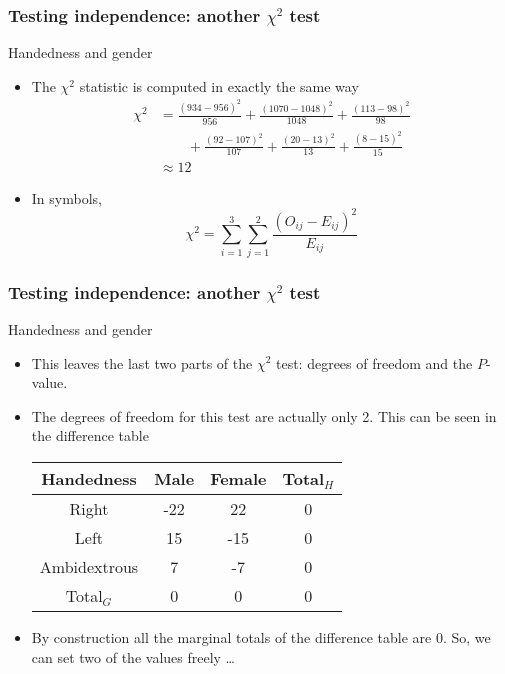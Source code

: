 \documentclass[handout]{beamer}
\begin{document}

   \begin{frame} \frametitle{Testing independence: another $\chi^2$ test}

   \begin{block}
     {Handedness and gender}
     \begin{itemize}
     \item The $\chi^2$ statistic is computed in exactly the same way
       $$
       \begin{aligned}
         \chi^2 &= \frac{(934-956)^2}{956} + \frac{(1070-1048)^2}{1048} +
          \frac{(113-98)^2}{98} \\
         & \qquad +  \frac{(92-107)^2}{107} + \frac{(20-13)^2}{13} + \frac{(8-15)^2}{15}  \\
         &\approx 12
       \end{aligned}
       $$
       \item
       In symbols,
       $$
       \chi^2 = \sum_{i=1}^3 \sum_{j=1}^2 \frac{(O_{ij}-E_{ij})^2}{E_{ij}}
       $$
     \end{itemize}
   \end{block}
   \end{frame}


   \begin{frame} \frametitle{Testing independence: another $\chi^2$ test}

   \begin{block}
     {Handedness and gender}
     \begin{itemize}
     \item This leaves the last two parts of the $\chi^2$ test: degrees of freedom and the $P$-value.
       \item The degrees of freedom for this test are actually only 2. This can be seen in the difference table


     \begin{tabular}{c|c|c|c}
       Handedness & Male & Female & Total$_H$ \\ \hline
       Right & -22 & 22 & 0 \\
       Left & 15 & -15 & 0 \\
       Ambidextrous & 7 & -7 & 0 \\ \hline
       Total$_G$ & 0 & 0 & 0
     \end{tabular}

     \item By construction all the marginal totals of the difference table
     are 0. So, we can set two of the values freely \dots

     \end{itemize}
   \end{block}
   \end{frame}
\end{document}
